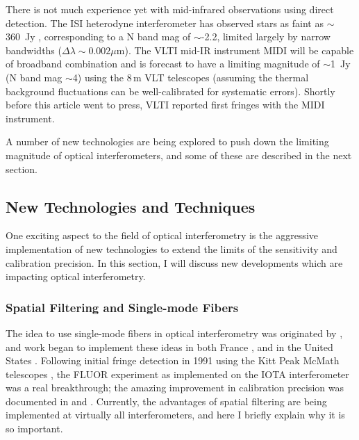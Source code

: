 \documentclass[12pt]{article}
\begin{document}
There is not much experience yet with mid-infrared observations using
direct detection.  The ISI heterodyne interferometer has observed
stars as faint as $\sim$360~Jy \citep[LkH$\alpha$,101][]{tuthill2002},
corresponding to a N band mag of $\sim$-2.2, limited largely by narrow
bandwidths ($\Delta\lambda\sim0.002\mu$m). The VLTI mid-IR instrument
MIDI will be capable of broadband combination and is forecast to have
a limiting magnitude of $\sim$1~Jy (N band mag $\sim$4) using the 8\,m
VLT telescopes (assuming the thermal background fluctuations can be
well-calibrated for systematic errors).  Shortly before this article
went to press, VLTI reported first fringes with the MIDI instrument.

A number of new technologies are being explored to push down the
limiting magnitude of optical interferometers, and some of these are
described in the next section.

\subsection{New Technologies and Techniques}
\label{newtechnology}

One exciting aspect to the field of optical interferometry
is the aggressive implementation
of new technologies to extend the limits of the sensitivity and 
calibration precision.  In this section, I will discuss 
new developments which are impacting optical interferometry.

\subsubsection{Spatial Filtering and Single-mode Fibers}
\label{spatialfiltering}
The idea to use single-mode fibers in optical interferometry was
originated by \citet{froehly1982}, and work began to implement these
ideas in both France \citep[e.g.,][]{connes1987,reynaud1992}, and in
the United States \citep{shaklan1987,shaklan1989}.  Following initial
fringe detection in 1991 using the Kitt Peak McMath telescopes
\citep{foresto1992}, the FLUOR experiment as implemented on the IOTA
interferometer was a real breakthrough; the amazing improvement in
calibration precision was documented in \citet{foresto1997} and
\citet{perrin1998}.  Currently, the advantages of spatial filtering
are being implemented at virtually all interferometers, and here I
briefly explain why it is so important.
\end{document}
